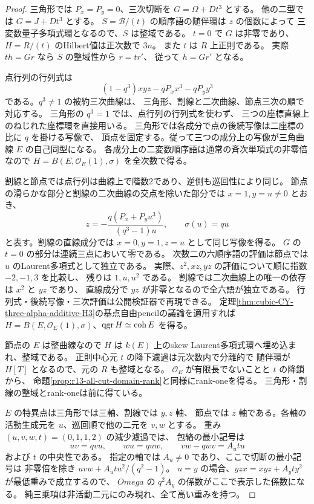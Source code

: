 \begin{proof}
三角形では $P_x=P_y=0$、三次切断を $G=\Omega+Dt^3$ とする。
他の二型では $G=J+Dt^3$ とする。
$S=\mathcal B/(t)$ の順序語の随伴環は $z$ の個数によって
三変数量子多項式環となるので、$S$ は整域である。
$t=0$ で $G$ は非零であり、$H=R/(t)$ のHilbert値は正次数で $3n$。
また $t$ は $R$ 上正則である。
実際 $th=Gr$ なら $S$ の整域性から $r=tr'$、
従って $h=Gr'$ となる。

点行列の行列式は
\[
 (1-q^3)xyz-qP_xx^3-qP_yy^3
\]
である。$q^3\ne1$ の被約三次曲線は、
三角形、割線と二次曲線、節点三次の順で対応する。
三角形の $q^3=1$ では、点行列の行列式を使わず、
三つの座標直線上のねじれた座標環を直接用いる。
三角形では各成分で点の後続写像は二座標の比に $q$ を掛ける写像で、
頂点を固定する。従って三つの成分上の写像が三角曲線 $E$ の自己同型になる。
各成分上の二変数順序語は通常の斉次単項式の非零倍なので
$H=B(E,\mathcal O_E(1),\sigma)$ を全次数で得る。

割線と節点では点行列は曲線上で階数2であり、逆側も巡回性により同じ。
節点の滑らかな部分と割線の二次曲線の交点を除いた部分では
$x=1,y=u\ne0$ とおき、
\[
 z=-\frac{q(P_x+P_yu^3)}{(q^3-1)u},\qquad \sigma(u)=qu
\]
と表す。割線の直線成分では $x=0,y=1,z=u$ として同じ写像を得る。
$G$ の $t=0$ の部分は連続三点において零である。
次数二の六順序語の評価は節点では $u$ のLaurent多項式として独立である。
実際、$z^2,xz,yz$ の評価について順に指数 $-2,-1,3$ を比較し、
残りは $1,u,u^2$ である。
割線では二次曲線上の唯一の依存は $x^2$ と $yz$ であり、
直線成分で $yz$ が非零となるので全六語が独立である。
行列式・後続写像・三次評価は公開検証器で再現できる。
定理\ref{thm:cubic-CY-three-alpha-additive-H3}の基点自由pencilの議論を適用すれば
$H=B(E,\mathcal O_E(1),\sigma)$、$\operatorname{qgr} H\simeq\operatorname{coh}E$ を得る。

節点の $E$ は整曲線なので $H$ は
$k(E)$ 上のskew Laurent多項式環へ埋め込まれ、整域である。
正則中心元 $t$ の降下濾過は元次数内で分離的で
随伴環が $H[T]$ となるので、元の $R$ も整域となる。
$\mathcal O_E$ が有限長でないことと $t$ の降鎖から、
命題\ref{prop:r13-all-cut-domain-rank}と同様にrank-oneを得る。
三角形・割線の整域とrank-oneは前に得ている。

$E$ の特異点は三角形では三軸、割線では $y,z$ 軸、
節点では $z$ 軸である。各軸の活動生成元を $u$、巡回順で他の二元を $v,w$ とする。
重み $(u,v,w,t)=(0,1,1,2)$ の減少濾過では、
包絡の最小記号は
\[
 uv=qvu,\qquad wu=quw,\qquad vw-qwv=A_u t u
\]
および $t$ の中央性である。
指定の軸では $A_u\ne0$ であり、ここで切断の最小記号は
非零倍を除き $uvw+A_u t u^2/(q^2-1)$。
$u=y$ の場合、$yzx=xyz+A_y t y^2$ が最低重みで成立するので、
$Omega$ の $q^2 A_y$ の係数がここで表示した係数になる。
純三乗項は非活動二元にのみ現れ、全て高い重みを持つ。


\end{proof}
